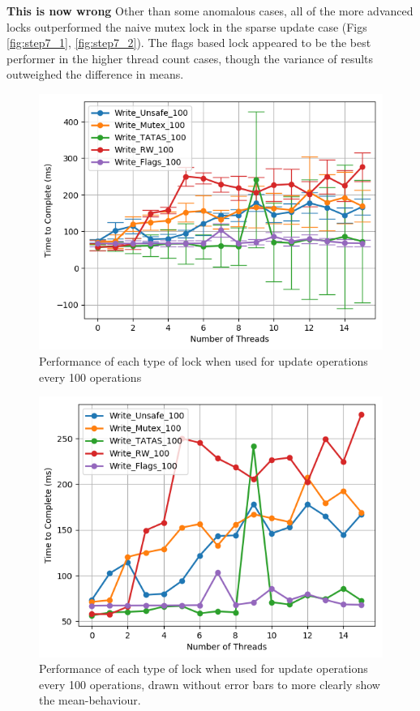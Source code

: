 \documentclass[11pt]{article}
\newcommand{\todo}[1]{\textbf{#1}}
\begin{document}
\todo{This is now wrong}
Other than some anomalous cases, all of the more advanced locks outperformed the naive mutex lock in the sparse update case (Figs \ref{fig:step7_1}, \ref{fig:step7_2}). The flags based lock appeared to be the best performer in the higher thread count cases, though the variance of results outweighed the difference in means.

\begin{figure}\label{fig:step7_3}
\centering
\includegraphics[scale=0.65]{step7_3.png}
\caption{Performance of each type of lock when used for update operations every 100 operations}
\end{figure}

\begin{figure}\label{fig:step7_4}
\centering
\includegraphics[scale=0.65]{step7_4.png}
\caption{Performance of each type of lock when used for update operations every 100 operations, drawn without error bars to more clearly show the mean-behaviour.}
\end{figure}
\end{document}
